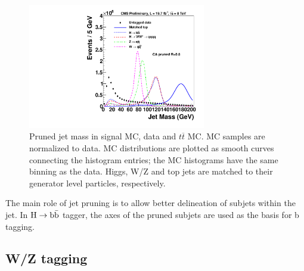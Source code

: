 \begin{figure}[htb]
\begin{center}
\includegraphics[width=0.69\textwidth]{EXO-14-009/HbbZqqfigs/Signal/signal-data-qcd-jetmass.pdf}
\end{center}
\caption{Pruned jet mass in signal MC, data and $t\overline{t}$ MC. 
  MC samples are normalized to data.  MC
  distributions are plotted as smooth curves connecting the histogram
  entries; the MC histograms have the same binning as the data.
  Higgs, W/Z and top jets are matched to their generator level particles, 
  respectively. }
\label{fig:JetMassTagging}
\end{figure}


The main role of jet pruning is to allow better delineation of subjets
within the jet.  In ${\rm H \to b\bar{b}}$ tagger, the axes of the 
pruned subjets are used as the basis for b tagging.



\subsection{W/Z tagging  } 
\label{sec:wztagging}


